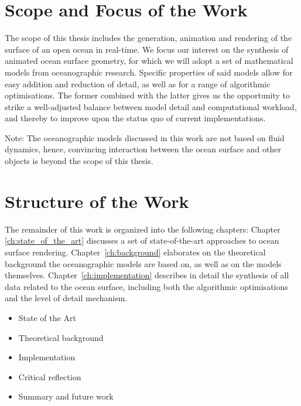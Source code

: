 \section{Scope and Focus of the Work}
\label{sec:scope_and_focus}
The scope of this thesis includes the generation, animation and rendering of the
surface of an open ocean in real-time. We focus our interest on the synthesis of
animated ocean surface geometry, for which we will adopt a set of mathematical
models from oceanographic research. Specific properties of said models allow for
easy addition and reduction of detail, as well as for a range of algorithmic
optimisations. The former combined with the latter gives us the opportunity to
strike a well-adjusted balance between model detail and computational workload,
and thereby to improve upon the status quo of current implementations.

Note: The oceanographic models discussed in this work are not based on fluid
dynamics, hence, convincing interaction between the ocean surface and other
objects is beyond the scope of this thesis.

\section{Structure of the Work}
\label{sec:structure}
The remainder of this work is organized into the following chapters: Chapter
\ref{ch:state_of_the_art} discusses a set of state-of-the-art approaches to
ocean surface rendering. Chapter~\ref{ch:background} elaborates on the
theoretical background the oceanographic models are based on, as well as on the
models themselves. Chapter~\ref{ch:implementation} describes in detail the
synthesis of all data related to the ocean surface, including both the algorithmic
optimisations and the level of detail mechanism.

\begin{itemize}
\item State of the Art
\item Theoretical background
\item Implementation
\item Critical reflection
\item Summary and future work

\end{itemize}
